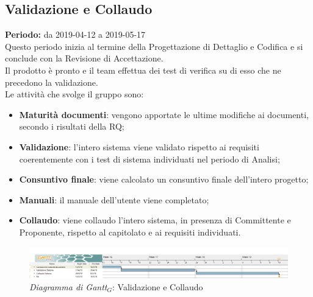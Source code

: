 \begin{flushleft}
\newpage
\section{Validazione e Collaudo}
\textbf{Periodo:} da 2019-04-12 a 2019-05-17\\
Questo periodo inizia al termine della Progettazione di Dettaglio e Codifica e si conclude con la Revisione di Accettazione.\\
Il prodotto è pronto e il team effettua dei test di verifica su di esso che ne precedono la validazione.\\
Le attività che svolge il gruppo sono:
\begin{itemize}
   \item \textbf{Maturità documenti}: vengono apportate le ultime modifiche ai documenti, secondo i risultati della RQ;
   \item \textbf{Validazione}: l'intero sistema viene validato rispetto ai requisiti coerentemente con i test di sistema individuati nel periodo di Analisi;
   \item \textbf{Consuntivo finale}: viene calcolato un consuntivo finale dell'intero progetto;
   \item \textbf{Manuali}: il manuale dell'utente viene completato;
   \item \textbf{Collaudo}: viene collaudo l'intero sistema, in presenza di Committente e Proponente, rispetto al capitolato e ai requisiti individuati. 
\end{itemize}
\begin{figure} [h]
    \centering
    \includegraphics[scale=0.29]{./images/ZeroSevenGanttVerifica.png}
    \caption{\textit{Diagramma di Gantt$_{G}$}: Validazione e Collaudo }\label{G5}
\end{figure}
\end{flushleft}